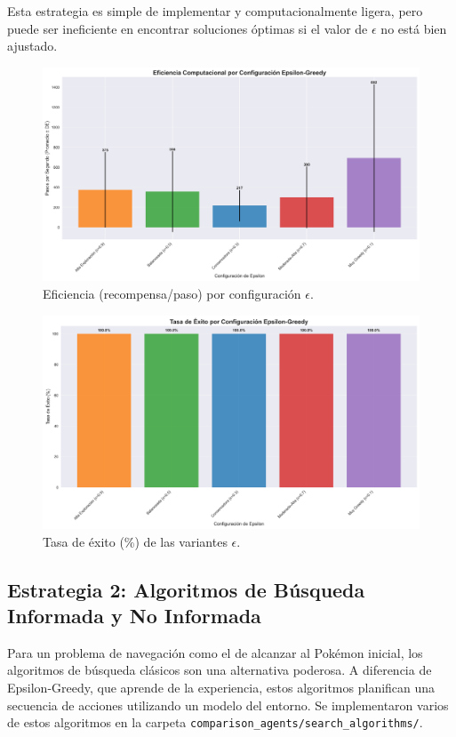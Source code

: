 \documentclass[12pt, oneside, openany]{book}
\begin{document}
Esta estrategia es simple de implementar y computacionalmente ligera, pero puede ser ineficiente en encontrar soluciones óptimas si el valor de $\epsilon$ no está bien ajustado.

\begin{figure}[H]
    \centering
    \includegraphics[width=1\textwidth]{epsilon_eficiencia_comparacion.png}
    \caption{Eficiencia (recompensa/paso) por configuración $\epsilon$.}
    \label{fig:epsilon_eficiencia}
\end{figure}

\begin{figure}[H]
    \centering
    \includegraphics[width=1\textwidth]{epsilon_exito_comparacion.png}
    \caption{Tasa de éxito (\%) de las variantes $\epsilon$.}
    \label{fig:epsilon_exito}
\end{figure}

\subsection{Estrategia 2: Algoritmos de Búsqueda Informada y No Informada}
Para un problema de navegación como el de alcanzar al Pokémon inicial, los algoritmos de búsqueda clásicos son una alternativa poderosa. A diferencia de Epsilon-Greedy, que aprende de la experiencia, estos algoritmos planifican una secuencia de acciones utilizando un modelo del entorno. Se implementaron varios de estos algoritmos en la carpeta \texttt{comparison\_agents/search\_algorithms/}.
\end{document}
